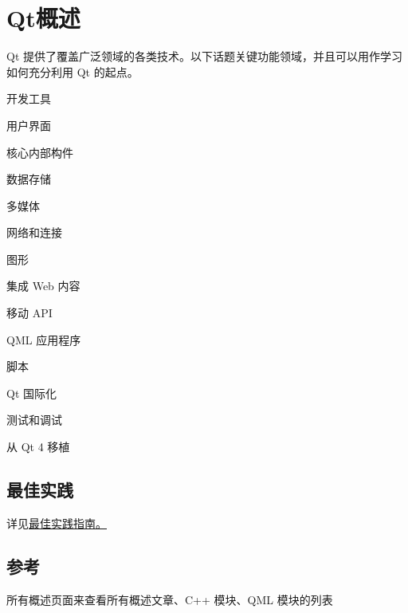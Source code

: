 \chapter{Qt概述}

Qt 提供了覆盖广泛领域的各类技术。以下话题关键功能领域，并且可以用作学习如何充分利用 Qt 的起点。

\begin{compactitem}
\item 开发工具
\item 用户界面
\item 核心内部构件
\item 数据存储
\item 多媒体
\item 网络和连接
\item 图形
\item 集成 Web 内容
\item 移动 API
\item QML 应用程序
\item 脚本
\item Qt 国际化
\item 测试和调试
\item 从 Qt 4 移植
\end{compactitem}


\section{最佳实践}

详见\href{https://gitee.com/wcc210/QtDocumentCN/blob/master/Src/B/Best_Practice_Guides/Best_Practice_Guides.md}{最佳实践指南。}


\section{参考}

\begin{seeAlso}
所有概述页面来查看所有概述文章、C++ 模块、QML 模块的列表
\end{seeAlso}

